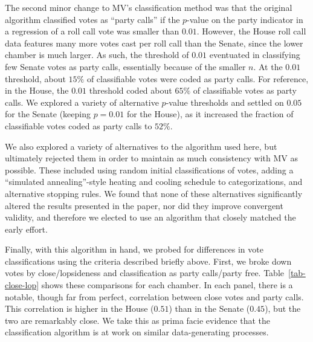 \documentclass[12pt]{article}
\begin{document}
The second minor change to MV's classification method was that the original algorithm classified votes as ``party calls'' if the $p$-value on the party indicator in a regression of a roll call vote was smaller than $0.01$.  However, the House roll call data features many more votes cast per roll call than the Senate, since the lower chamber is much larger.  As such, the threshold of $0.01$ eventuated in classifying few
Senate votes as party calls, essentially because of the smaller $n$.
At the $0.01$ threshold, about $15\%$ of classifiable votes were coded as party calls.
For reference, in the House, the $0.01$ threshold coded about $65\%$ of classifiable votes as party calls.
We explored a variety of alternative $p$-value thresholds and settled on $0.05$ for the Senate (keeping $p = 0.01$ for the House), as it
increased the fraction of classifiable votes coded as party calls to $52\%$.

We also explored a variety of alternatives to the algorithm used here, but ultimately rejected them in order to maintain as much consistency with MV as possible.  These included using random initial classifications of votes, adding a ``simulated annealing''-style heating and cooling schedule to categorizations, and alternative stopping rules.  We found that none of these alternatives significantly altered the results presented in the paper, nor did they improve convergent validity, and therefore we elected to use an algorithm that closely matched the early effort.

Finally, with this algorithm in hand, we probed for differences in vote classifications using the criteria described briefly above.  First, we broke down votes by close/lopsideness and classification as party calls/party free.  Table~\ref{tab-close-lop} shows these comparisons for each chamber. In each panel, there is a notable, though far from perfect, correlation between close votes and party calls.  This correlation is higher in the House ($0.51$) than in the Senate ($0.45$), but the two are remarkably close.  We take this as prima facie evidence that the classification algorithm is at work on similar data-generating processes.
\end{document}
